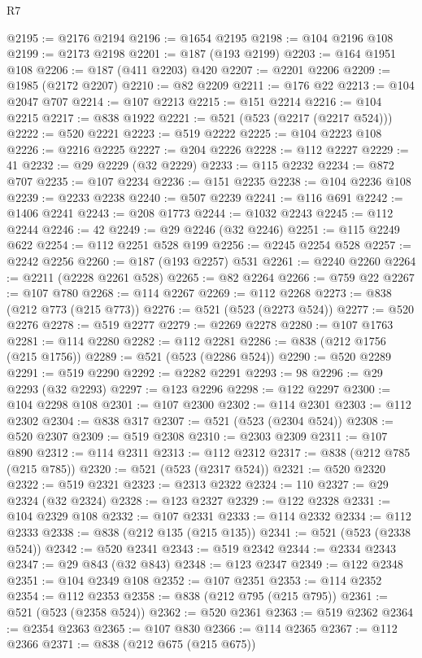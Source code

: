 \begin{lexlean}{R7}
\begin{coremodule}
@2195 := @2176 @2194
@2196 := @1654 @2195
@2198 := @104 @2196 @108
@2199 := @2173 @2198
@2201 := @187 (@193 @2199)
@2203 := @164 @1951 @108
@2206 := @187 (@411 @2203) @420
@2207 := @2201 @2206
@2209 := @1985 (@2172 @2207)
@2210 := @82 @2209
@2211 := @176 @22
@2213 := @104 @2047 @707
@2214 := @107 @2213
@2215 := @151 @2214
@2216 := @104 @2215
@2217 := @838 @1922
@2221 := @521 (@523 (@2217 (@2217 @524)))
@2222 := @520 @2221
@2223 := @519 @2222
@2225 := @104 @2223 @108
@2226 := @2216 @2225
@2227 := @204 @2226
@2228 := @112 @2227
@2229 := 41
@2232 := @29 @2229 (@32 @2229)
@2233 := @115 @2232
@2234 := @872 @707
@2235 := @107 @2234
@2236 := @151 @2235
@2238 := @104 @2236 @108
@2239 := @2233 @2238
@2240 := @507 @2239
@2241 := @116 @691
@2242 := @1406 @2241
@2243 := @208 @1773
@2244 := @1032 @2243
@2245 := @112 @2244
@2246 := 42
@2249 := @29 @2246 (@32 @2246)
@2251 := @115 @2249 @622
@2254 := @112 @2251 @528 @199
@2256 := @2245 @2254 @528
@2257 := @2242 @2256
@2260 := @187 (@193 @2257) @531
@2261 := @2240 @2260
@2264 := @2211 (@2228 @2261 @528)
@2265 := @82 @2264
@2266 := @759 @22
@2267 := @107 @780
@2268 := @114 @2267
@2269 := @112 @2268
@2273 := @838 (@212 @773 (@215 @773))
@2276 := @521 (@523 (@2273 @524))
@2277 := @520 @2276
@2278 := @519 @2277
@2279 := @2269 @2278
@2280 := @107 @1763
@2281 := @114 @2280
@2282 := @112 @2281
@2286 := @838 (@212 @1756 (@215 @1756))
@2289 := @521 (@523 (@2286 @524))
@2290 := @520 @2289
@2291 := @519 @2290
@2292 := @2282 @2291
@2293 := 98
@2296 := @29 @2293 (@32 @2293)
@2297 := @123 @2296
@2298 := @122 @2297
@2300 := @104 @2298 @108
@2301 := @107 @2300
@2302 := @114 @2301
@2303 := @112 @2302
@2304 := @838 @317
@2307 := @521 (@523 (@2304 @524))
@2308 := @520 @2307
@2309 := @519 @2308
@2310 := @2303 @2309
@2311 := @107 @890
@2312 := @114 @2311
@2313 := @112 @2312
@2317 := @838 (@212 @785 (@215 @785))
@2320 := @521 (@523 (@2317 @524))
@2321 := @520 @2320
@2322 := @519 @2321
@2323 := @2313 @2322
@2324 := 110
@2327 := @29 @2324 (@32 @2324)
@2328 := @123 @2327
@2329 := @122 @2328
@2331 := @104 @2329 @108
@2332 := @107 @2331
@2333 := @114 @2332
@2334 := @112 @2333
@2338 := @838 (@212 @135 (@215 @135))
@2341 := @521 (@523 (@2338 @524))
@2342 := @520 @2341
@2343 := @519 @2342
@2344 := @2334 @2343
@2347 := @29 @843 (@32 @843)
@2348 := @123 @2347
@2349 := @122 @2348
@2351 := @104 @2349 @108
@2352 := @107 @2351
@2353 := @114 @2352
@2354 := @112 @2353
@2358 := @838 (@212 @795 (@215 @795))
@2361 := @521 (@523 (@2358 @524))
@2362 := @520 @2361
@2363 := @519 @2362
@2364 := @2354 @2363
@2365 := @107 @830
@2366 := @114 @2365
@2367 := @112 @2366
@2371 := @838 (@212 @675 (@215 @675))

\end{coremodule}
\end{lexlean}
